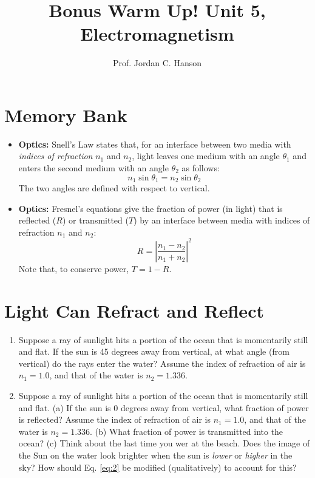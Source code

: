 \documentclass{article}
\begin{document}
\title{Bonus Warm Up!  Unit 5, Electromagnetism}
\author{Prof. Jordan C. Hanson}

\maketitle

\section{Memory Bank}

\begin{itemize}
\item \textbf{Optics:} Snell's Law states that, for an interface between two media with \textit{indices of refraction} $n_1$ and $n_2$, light leaves one medium with an angle $\theta_1$ and enters the second medium with an angle $\theta_2$ as follows:
\begin{equation}
n_1 \sin\theta_1 = n_2\sin\theta_2
\end{equation}
\noindent The two angles are defined with respect to vertical.
\item \textbf{Optics:} Fresnel's equations give the fraction of power (in light) that is reflected ($R$) or transmitted ($T$) by an interface between media with indices of refraction $n_1$ and $n_2$:
\begin{equation}
R = \left| \frac{n_1 - n_2}{n_1 + n_2} \right|^2 \label{eq:2}
\end{equation}
\noindent Note that, to conserve power, $T = 1 - R$.
\end{itemize}

\section{Light Can Refract and Reflect}

\begin{enumerate}
\item Suppose a ray of sunlight hits a portion of the ocean that is momentarily still and flat.  If the sun is 45 degrees away from vertical, at what angle (from vertical) do the rays enter the water?  Assume the index of refraction of air is $n_1 = 1.0$, and that of the water is $n_2 = 1.336$. \\ \vspace{2cm}
\item Suppose a ray of sunlight hits a portion of the ocean that is momentarily still and flat.  (a) If the sun is 0 degrees away from vertical, what fraction of power is reflected?  Assume the index of refraction of air is $n_1 = 1.0$, and that of the water is $n_2 = 1.336$. (b) What fraction of power is transmitted into the ocean?  (c) Think about the last time you wer at the beach.  Does the image of the Sun on the water look brighter when the sun is \textit{lower} or \textit{higher} in the sky?  How should Eq. \ref{eq:2} be modified (qualitatively) to account for this? \\ \vspace{2cm}
\end{enumerate}
\end{document}
